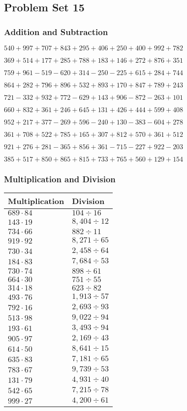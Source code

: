 \hypertarget{problem-set-15-2}{%
\subsection{Problem Set 15}\label{problem-set-15-2}}

\hypertarget{addition-and-subtraction-115}{%
\subsubsection{Addition and
Subtraction}\label{addition-and-subtraction-115}}

\(540 + 997 + 707 + 843 + 295 + 406 + 250 + 400 + 992 + 782\)

\(369 + 514 + 177 + 285 + 788 + 183 + 146 + 272 + 876 + 351\)

\(759 + 961 - 519 - 620 + 314 - 250 - 225 + 615 + 284 + 744\)

\(864 + 282 + 796 + 896 + 532 + 893 + 170 + 847 + 789 + 243\)

\(721 - 332 + 932 + 772 - 629 + 143 + 906 - 872 - 263 + 101\)

\(660 + 832 + 361 + 246 + 645 + 131 + 426 + 444 + 599 + 408\)

\(952 + 217 + 377 - 269 + 596 - 240 + 130 - 383 - 604 + 278\)

\(361 + 708 + 522 + 785 + 165 + 307 + 812 + 570 + 361 + 512\)

\(921 + 276 + 281 - 365 + 856 + 361 - 715 - 227 + 922 - 203\)

\(385 + 517 + 850 + 865 + 815 + 733 + 765 + 560 + 129 + 154\)

\hypertarget{multiplication-and-division-115}{%
\subsubsection{Multiplication and
Division}\label{multiplication-and-division-115}}

\begin{longtable}[]{@{}ll@{}}
\toprule
Multiplication & Division\tabularnewline
\midrule
\endhead
\(689 \cdot 84\) & \(104÷16\)\tabularnewline
\(143 \cdot 19\) & \(8,404÷12\)\tabularnewline
\(734 \cdot 66\) & \(882÷11\)\tabularnewline
\(919 \cdot 92\) & \(8,271÷65\)\tabularnewline
\(730 \cdot 34\) & \(2,458÷64\)\tabularnewline
\(184 \cdot 83\) & \(7,684÷53\)\tabularnewline
\(730 \cdot 74\) & \(898÷61\)\tabularnewline
\(664 \cdot 30\) & \(751÷55\)\tabularnewline
\(314 \cdot 18\) & \(623÷82\)\tabularnewline
\(493 \cdot 76\) & \(1,913÷57\)\tabularnewline
\(792 \cdot 16\) & \(2,693÷93\)\tabularnewline
\(513 \cdot 98\) & \(9,022÷94\)\tabularnewline
\(193 \cdot 61\) & \(3,493÷94\)\tabularnewline
\(905 \cdot 97\) & \(2,169÷43\)\tabularnewline
\(614 \cdot 50\) & \(8,641÷15\)\tabularnewline
\(635 \cdot 83\) & \(7,181÷65\)\tabularnewline
\(783 \cdot 67\) & \(9,739÷53\)\tabularnewline
\(131 \cdot 79\) & \(4,931÷40\)\tabularnewline
\(542 \cdot 65\) & \(7,215÷78\)\tabularnewline
\(999 \cdot 27\) & \(4,200÷61\)\tabularnewline
\bottomrule
\end{longtable}

